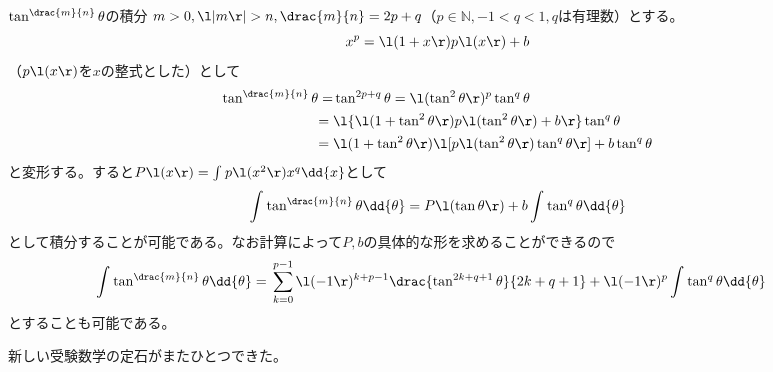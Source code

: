 \documentclass[a4j,uplatex,dvipdfmx,10pt]{jsarticle}
\begin{document}
\begin{myburgundybox}{\(\tan ^{\drac{m}{n}}\theta  \)の積分}
	\(m>0,\l|m\r|>n ,\drac{m}{n} =2p+q\)（\(p \in \mathbb{N},-1<q<1, qは有理数 \)）とする。
	\begin{equation}
	x^p=\l(1+x\r)p\l(x\r)+b
	\label{eqn:2022-09-15_20-28-36}
	\end{equation}
	（\(p\l(x\r) \)を\(x \)の整式とした）として
\begin{align}
\tan ^{\drac{m}{n}}\theta=& {} \tan ^{2p+q}\theta =\l(\tan ^2\theta \r)^p\tan ^{q}\theta \\
= {}& \l\{\l(1+\tan ^2 \theta \r)p\l(\tan ^2 \theta \r)+b\r\}\tan ^q \theta \\
= {}& \l(1+\tan ^2 \theta \r)\l[p\l(\tan ^2 \theta \r)\tan ^q \theta \r]+b \tan ^q \theta 
\label{eqn:2022-09-15_20-22-55}
\end{align}
と変形する。すると\(P\l(x\r)=\int_{}^{} p\l(x^2\r)x^q\dd{x} \)として
\begin{equation}
\int_{}^{} \tan ^{\drac{m}{n}}\theta \dd{\theta }=P\l(\tan \theta \r)+b \int_{}^{} \tan ^q \theta \dd{\theta }
\label{eqn:2022-09-15_20-38-09}
\end{equation}
として積分することが可能である。なお計算によって\(P,b \)の具体的な形を求めることができるので
\begin{equation}\begin{split}
\int_{}^{} \tan ^{\drac{m}{n}}\theta \dd{\theta }= {}& \sum_{k=0}^{p-1} \l(-1\r)^{k+p-1}\drac{\tan ^{2k+q+1}\theta }{2k+q+1}+\l(-1\r)^p \int_{}^{} \tan ^q \theta \dd{\theta }
\end{split}\label{eqn:2022-09-16_12-45-57}
\end{equation}
とすることも可能である。
\end{myburgundybox}
新しい受験数学の定石がまたひとつできた。
\end{document}
